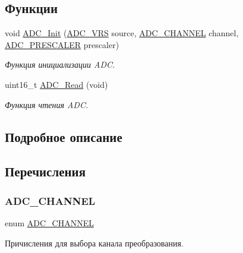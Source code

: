 \subsection*{Функции}
\begin{DoxyCompactItemize}
\item 
void \mbox{\hyperlink{group___a_d_c_ga8f2145955b327ab27b9ea9c0fb91feef}{A\+D\+C\+\_\+\+Init}} (\mbox{\hyperlink{group___a_d_c_ga5dad3282f36afa086c23dcd8914f5159}{A\+D\+C\+\_\+\+V\+RS}} source, \mbox{\hyperlink{group___a_d_c_gaecdfe48b0bc36d2dd1f99274613a6c92}{A\+D\+C\+\_\+\+C\+H\+A\+N\+N\+EL}} channel, \mbox{\hyperlink{group___a_d_c_gaed8f948440ecdc58f0e7139db60e8e8e}{A\+D\+C\+\_\+\+P\+R\+E\+S\+C\+A\+L\+ER}} prescaler)
\begin{DoxyCompactList}\small\item\em Функция инициализации A\+DC. \end{DoxyCompactList}\item 
uint16\+\_\+t \mbox{\hyperlink{group___a_d_c_ga61a3f6d05f7d6ea3dbef50cc7d01bc2e}{A\+D\+C\+\_\+\+Read}} (void)
\begin{DoxyCompactList}\small\item\em Функция чтения A\+DC. \end{DoxyCompactList}\end{DoxyCompactItemize}


\subsection{Подробное описание}


\subsection{Перечисления}
\mbox{\label{group___a_d_c_gaecdfe48b0bc36d2dd1f99274613a6c92}} 
\subsubsection{\texorpdfstring{A\+D\+C\+\_\+\+C\+H\+A\+N\+N\+EL}{ADC\_CHANNEL}}
{\footnotesize\ttfamily enum \mbox{\hyperlink{group___a_d_c_gaecdfe48b0bc36d2dd1f99274613a6c92}{A\+D\+C\+\_\+\+C\+H\+A\+N\+N\+EL}}}



Причисления для выбора канала преобразования. 

